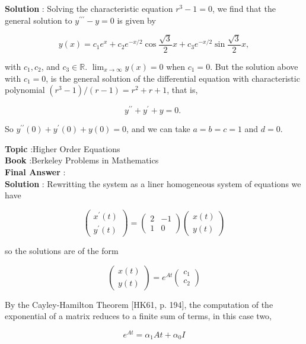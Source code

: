 \documentclass[10pt]{article}
\begin{document}
\textbf{Solution} : Solving the characteristic equation $r^{3}-1=0$, we find that the general solution to $y^{\prime \prime \prime}-y=0$ is given by

$$
y(x)=c_{1} e^{x}+c_{2} e^{-x / 2} \cos \frac{\sqrt{3}}{2} x+c_{3} e^{-x / 2} \sin \frac{\sqrt{3}}{2} x,
$$

with $c_{1}, c_{2}$, and $c_{3} \in \mathbb{R}$. $\lim _{x \rightarrow \infty} y(x)=0$ when $c_{1}=0$. But the solution above with $c_{1}=0$, is the general solution of the differential equation with characteristic polynomial $\left(r^{3}-1\right) /(r-1)=r^{2}+r+1$, that is,

$$
y^{\prime \prime}+y^{\prime}+y=0 \text {. }
$$

So $y^{\prime \prime}(0)+y^{\prime}(0)+y(0)=0$, and we can take $a=b=c=1$ and $d=0$. 


\textbf{Topic} :Higher Order Equations \\
\textbf{Book} :Berkeley Problems in Mathematics\\
\textbf{Final Answer} :\\


\textbf{Solution} : Rewritting the system as a liner homogeneous system of equations we have

$$
\left(\begin{array}{c}
x^{\prime}(t) \\
y^{\prime}(t)
\end{array}\right)=\left(\begin{array}{cc}
2 & -1 \\
1 & 0
\end{array}\right)\left(\begin{array}{l}
x(t) \\
y(t)
\end{array}\right)
$$

so the solutions are of the form

$$
\left(\begin{array}{l}
x(t) \\
y(t)
\end{array}\right)=e^{A t}\left(\begin{array}{l}
c_{1} \\
c_{2}
\end{array}\right)
$$

By the Cayley-Hamilton Theorem [HK61, p. 194], the computation of the exponential of a matrix reduces to a finite sum of terms, in this case two,

$$
e^{A t}=\alpha_{1} A t+\alpha_{0} I
$$
\end{document}
